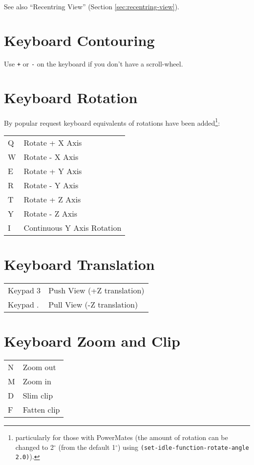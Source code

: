 \documentclass{book}
\begin{document}
See also ``Recentring View'' (Section \ref{sec:recentring-view}).

\section{Keyboard Contouring}

Use \texttt{+} or \texttt{-} on the keyboard if you don't have a
scroll-wheel.

\section{Keyboard Rotation}
By popular request keyboard equivalents of
rotations have been added\footnote{particularly for those with
  PowerMates (the amount of rotation can be changed to 2$^\circ$ (from
  the default 1$^\circ$) using \texttt{(set-idle-function-rotate-angle
    2.0)}).}: \vspace{3mm}

\begin{tabular}{ll}
  Q & Rotate + X Axis \\
  W & Rotate - X Axis \\
  E & Rotate + Y Axis \\
  R & Rotate - Y Axis \\
  T & Rotate + Z Axis \\
  Y & Rotate - Z Axis \\
  I & Continuous Y Axis Rotation
\end{tabular}

\section{Keyboard Translation}
\label{keyboard_translation}
\begin{tabular}{ll}
  Keypad 3 & Push View (+Z translation)\\
  Keypad . & Pull View (-Z translation)
\end{tabular}


\section{Keyboard Zoom and Clip}

\begin{tabular}{ll}

  N & Zoom out   \\
  M & Zoom in    \\
  D & Slim clip  \\
  F & Fatten clip\\
\end{tabular}
\end{document}
